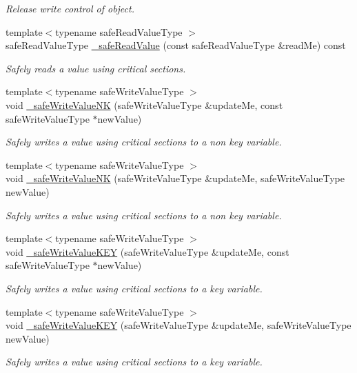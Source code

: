 \begin{DoxyCompactItemize}
\begin{DoxyCompactList}\small\item\em Release write control of object. \item\end{DoxyCompactList}\item 
{\footnotesize template$<$typename safeReadValueType $>$ }\\safeReadValueType \hyperlink{class_concurrency_control_aee7ec3509126d17541eb80dab78385c3}{\_\-safeReadValue} (const safeReadValueType \&readMe) const 
\begin{DoxyCompactList}\small\item\em Safely reads a value using critical sections. \item\end{DoxyCompactList}\item 
{\footnotesize template$<$typename safeWriteValueType $>$ }\\void \hyperlink{class_concurrency_control_a33065392a618a5b52ac4bb40fb12baf5}{\_\-safeWriteValueNK} (safeWriteValueType \&updateMe, const safeWriteValueType $\ast$newValue)
\begin{DoxyCompactList}\small\item\em Safely writes a value using critical sections to a non key variable. \item\end{DoxyCompactList}\item 
{\footnotesize template$<$typename safeWriteValueType $>$ }\\void \hyperlink{class_concurrency_control_af11f93d42d36e6760925bb17d522e3e9}{\_\-safeWriteValueNK} (safeWriteValueType \&updateMe, safeWriteValueType newValue)
\begin{DoxyCompactList}\small\item\em Safely writes a value using critical sections to a non key variable. \item\end{DoxyCompactList}\item 
{\footnotesize template$<$typename safeWriteValueType $>$ }\\void \hyperlink{class_concurrency_control_a3d636cd5098ec1171887d9124629a362}{\_\-safeWriteValueKEY} (safeWriteValueType \&updateMe, const safeWriteValueType $\ast$newValue)
\begin{DoxyCompactList}\small\item\em Safely writes a value using critical sections to a key variable. \item\end{DoxyCompactList}\item 
{\footnotesize template$<$typename safeWriteValueType $>$ }\\void \hyperlink{class_concurrency_control_a0b1fd7acbdae6efd4d4b8f0a7b076eba}{\_\-safeWriteValueKEY} (safeWriteValueType \&updateMe, safeWriteValueType newValue)
\begin{DoxyCompactList}\small\item\em Safely writes a value using critical sections to a key variable. \item\end{DoxyCompactList}\end{DoxyCompactItemize}
